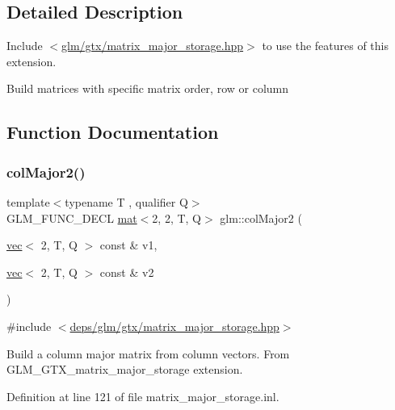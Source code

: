 \subsection{Detailed Description}
Include $<$\hyperlink{matrix__major__storage_8hpp}{glm/gtx/matrix\+\_\+major\+\_\+storage.\+hpp}$>$ to use the features of this extension.

Build matrices with specific matrix order, row or column 

\subsection{Function Documentation}
\mbox{\label{group__gtx__matrix__major__storage_gaaff72f11286e59a4a88ed21a347f284c}} 
\subsubsection{\texorpdfstring{col\+Major2()}{colMajor2()}\hspace{0.1cm}{\footnotesize\ttfamily [1/2]}}
{\footnotesize\ttfamily template$<$typename T , qualifier Q$>$ \\
G\+L\+M\+\_\+\+F\+U\+N\+C\+\_\+\+D\+E\+CL \hyperlink{structglm_1_1mat}{mat}$<$2, 2, T, Q$>$ glm\+::col\+Major2 (\begin{DoxyParamCaption}\item[{\hyperlink{structglm_1_1vec}{vec}$<$ 2, T, Q $>$ const \&}]{v1,  }\item[{\hyperlink{structglm_1_1vec}{vec}$<$ 2, T, Q $>$ const \&}]{v2 }\end{DoxyParamCaption})}



{\ttfamily \#include $<$\hyperlink{matrix__major__storage_8hpp}{deps/glm/gtx/matrix\+\_\+major\+\_\+storage.\+hpp}$>$}

Build a column major matrix from column vectors. From G\+L\+M\+\_\+\+G\+T\+X\+\_\+matrix\+\_\+major\+\_\+storage extension. 

Definition at line 121 of file matrix\+\_\+major\+\_\+storage.\+inl.

\mbox{\label{group__gtx__matrix__major__storage_gafc25fd44196c92b1397b127aec1281ab}} 
